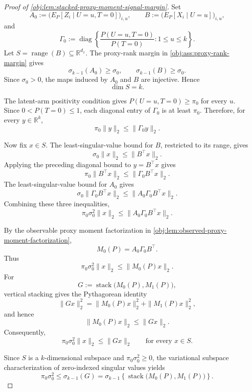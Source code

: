\documentclass[11pt]{article}
\begin{document}
\begin{proof}[Proof of \cref{obj:lem:stacked-proxy-moment-signal-margin}]
Set
\[
A_0:=\bigl(E_P[Z_i\mid U=u,T=0]\bigr)_{i,u},\qquad
B:=\bigl(E_P[X_i\mid U=u]\bigr)_{i,u},
\]
and
\[
\Gamma_0:=
\operatorname{diag}\left\{
\frac{P(U=u,T=0)}{P(T=0)}:1\le u\le k
\right\}.
\]
Let \(S=\operatorname{range}(B)\subseteq\mathbb R^{d_x}\).  The proxy-rank margin in
\cref{obj:ass:proxy-rank-margin} gives
\[
\sigma_{k-1}(A_0)\ge \sigma_0,\qquad
\sigma_{k-1}(B)\ge \sigma_0 .
\]
Since \(\sigma_0>0\), the maps induced by \(A_0\) and \(B\) are injective.  Hence
\[
\dim S=k .
\]

The latent-arm positivity condition gives \(P(U=u,T=0)\ge \pi_0\) for every \(u\).  Since
\(0<P(T=0)\le1\), each diagonal entry of \(\Gamma_0\) is at least \(\pi_0\).  Therefore, for every
\(y\in\mathbb R^k\),
\[
\pi_0\|y\|_2\le \|\Gamma_0y\|_2 .
\]

Now fix \(x\in S\).  The least-singular-value bound for \(B\), restricted to its range, gives
\[
\sigma_0\|x\|_2\le \|B^\top x\|_2 .
\]
Applying the preceding diagonal bound to \(y=B^\top x\) gives
\[
\pi_0\|B^\top x\|_2\le \|\Gamma_0B^\top x\|_2 .
\]
The least-singular-value bound for \(A_0\) gives
\[
\sigma_0\|\Gamma_0B^\top x\|_2
\le
\|A_0\Gamma_0B^\top x\|_2 .
\]
Combining these three inequalities,
\[
\pi_0\sigma_0^2\|x\|_2
\le
\|A_0\Gamma_0B^\top x\|_2 .
\]

By the observable proxy moment factorization in
\cref{obj:lem:observed-proxy-moment-factorization},
\[
M_0(P)=A_0\Gamma_0B^\top .
\]
Thus
\[
\pi_0\sigma_0^2\|x\|_2
\le
\|M_0(P)x\|_2 .
\]
For
\[
G:=\operatorname{stack}\bigl(M_0(P),M_1(P)\bigr),
\]
vertical stacking gives the Pythagorean identity
\[
\|Gx\|_2^2=\|M_0(P)x\|_2^2+\|M_1(P)x\|_2^2,
\]
and hence
\[
\|M_0(P)x\|_2\le \|Gx\|_2 .
\]
Consequently,
\[
\pi_0\sigma_0^2\|x\|_2\le \|Gx\|_2
\qquad\text{for every }x\in S .
\]

Since \(S\) is a \(k\)-dimensional subspace and \(\pi_0\sigma_0^2\ge0\), the variational
subspace characterization of zero-indexed singular values yields
\[
\pi_0\sigma_0^2
\le
\sigma_{k-1}(G)
=
\sigma_{k-1}\!\left\{\operatorname{stack}\bigl(M_0(P),M_1(P)\bigr)\right\}.
\]
\end{proof}
\end{document}
